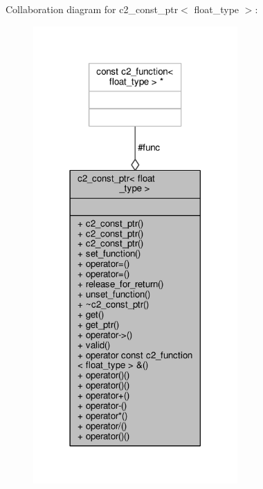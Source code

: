 Collaboration diagram for c2\+\_\+const\+\_\+ptr$<$ float\+\_\+type $>$\+:
\nopagebreak
\begin{figure}[H]
\begin{center}
\leavevmode
\includegraphics[width=221pt]{classc2__const__ptr__coll__graph}
\end{center}
\end{figure}

